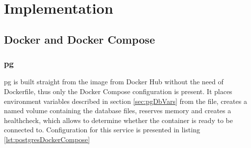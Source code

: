 
\chapter{Implementation}

%
%
\section{Docker and Docker Compose}
\subsection{\acrlong{pg}}
\acrlong{pg} is built straight from the image from Docker Hub without the need of Dockerfile, thus only the Docker Compose configuration is present. It places environment variables described in section \ref{sec:pgDbVars} from the file, creates a named volume containing the database files, reserves memory and creates a healthcheck, which allows to determine whether the container is ready to be connected to. Configuration for this service is presented in listing \ref{lst:postgresDockerCompose}


